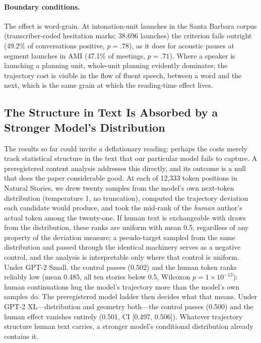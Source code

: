 \documentclass[12pt]{article}
\newcommand{\new}[1]{#1}   %
\begin{document}
{\paragraph{Boundary conditions.} The effect is word-grain. At intonation-unit launches in the Santa Barbara corpus (transcriber-coded hesitation marks; 38,696 launches) the criterion fails outright (49.2\% of conversations positive, $p = .78$), as it does for acoustic pauses at segment launches in AMI (47.1\% of meetings, $p = .71$). Where a speaker is launching a planning unit, whole-unit planning evidently dominates; the trajectory cost is visible in the flow of fluent speech, between a word and the next, which is the same grain at which the reading-time effect lives.}

\new{\subsection{The Structure in Text Is Absorbed by a Stronger Model's Distribution}\label{sec:content}

The results so far could invite a deflationary reading: perhaps the costs merely track statistical structure in the text that our particular model fails to capture. A preregistered content analysis addresses this directly, and its outcome is a null that does the paper considerable good. At each of 12,333 token positions in Natural Stories, we drew twenty samples from the model's own next-token distribution (temperature 1, no truncation), computed the trajectory deviation each candidate would produce, and took the mid-rank of the \emph{human} author's actual token among the twenty-one. If human text is exchangeable with draws from the distribution, these ranks are uniform with mean 0.5, regardless of any property of the deviation measure; a pseudo-target sampled from the same distribution and passed through the identical machinery serves as a negative control, and the analysis is interpretable only where that control is uniform. Under GPT-2 Small, the control passes (0.502) and the human token ranks reliably low (mean 0.485, all ten stories below 0.5, Wilcoxon $p = 1 \times 10^{-13}$): human continuations hug the model's trajectory more than the model's own samples do. The preregistered model ladder then decides what that means. Under GPT-2 XL---distribution and geometry both---the control passes (0.500) and the human effect vanishes entirely (0.501, CI [0.497, 0.506]). Whatever trajectory structure human text carries, a stronger model's conditional distribution already contains it.

}
\end{document}
